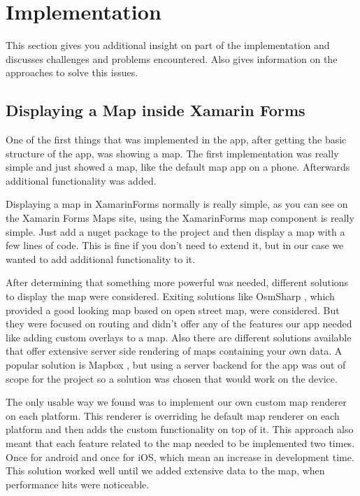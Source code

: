 \section{Implementation}
This section gives you additional insight on part of the implementation and discusses challenges and problems encountered. Also gives information on the approaches to solve this issues.

\subsection{Displaying a Map inside Xamarin Forms}
One of the first things that was implemented in the \gls{app}, after getting the basic structure of the \gls{app}, was showing a map. The first implementation was really simple and just showed a map, like the default map \gls{app} on a phone. Afterwards additional functionality was added.

Displaying a map in \gls{XamarinForms} normally is really simple, as you can see on the Xamarin Forms Maps \cite{xamMaps} site, using the \gls{XamarinForms} map component is really simple. Just add a \gls{nuget} package to the project and then display a map with a few lines of code. This is fine if you don't need to extend it, but in our case we wanted to add additional functionality to it.

After determining that something more powerful was needed, different solutions to display the map were considered. Exiting solutions like
OsmSharp \cite{osmsharp}, which provided a good looking map based on open street map, were considered. But they were focused on routing and didn't offer any of the features our \gls{app} needed like adding custom \glspl{overlay} to a map.
Also there are different solutions available that offer extensive server side rendering of maps containing your own data. A popular solution is Mapbox \cite{mapbox}, but using a server backend for the \gls{app} was out of scope for the project so a solution was chosen that would work on the device.

The only usable way we found was to implement our own custom map \gls{renderer} on each platform. This \gls{renderer} is overriding he default map \gls{renderer} on each platform and then adds the custom functionality on top of it. This approach also meant that each feature related to the map needed to be implemented two times. Once for android and once for iOS, which mean an increase in development time. This solution worked well until we added extensive data to the map, when performance hits were noticeable.

